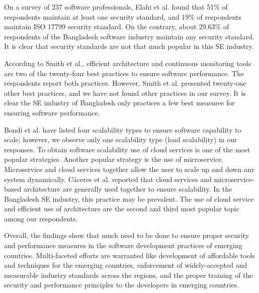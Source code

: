 On a survey of 237 software professionals, Elahi et al.\citep{Elahi2011} found
that 51\% of respondents maintain at least one security standard, and 19\% of
respondents maintain ISO 17799 security standard. On the contrary, about 29.63\%
of respondents of the Bangladesh software industry maintain any security
standard. It is clear that security standards are not that much popular in this
SE industry.

According to Smith et al.\citep{Smith2003}, efficient architecture and
continuous monitoring tools are two of the twenty-four best practices to ensure
software performance. The respondents report both practices. However, Smith et
al. presented twenty-one other best practices, and we have not found other
practices in our survey. It is clear the SE industry of Bangladesh only
practices a few best measures for ensuring software performance.



Bondi et al.\citep{Bondi2000} have listed four scalability types to ensure
software capability to scale; however, we observe only one scalability type
(load scalability) in our responses. To obtain software scalability use of cloud
services is one of the most popular strategies\citep{Gao2011}. Another popular
strategy is the use of microservice. Microservice and cloud services together
allow the user to scale up and down any system dynamically. C\'{a}ceres et
al.\citep{Cceres2010} reported that cloud services and microservice-based
architecture are generally used together to ensure scalability. In the
Bangladesh SE industry, this practice may be prevalent. The use of cloud service
and efficient use of architecture are the second and third most popular topic
among our respondents.

Overall, the findings show that much need to be done to ensure proper security and performance measures 
in the software development practices of emerging countries. Multi-faceted efforts are warranted like 
development of affordable tools and techniques for the emerging countries, enforcement of widely-accepted and 
measurable industry standards across the regions, and the proper training of the security and performance 
principles to the developers in emerging countries. 

